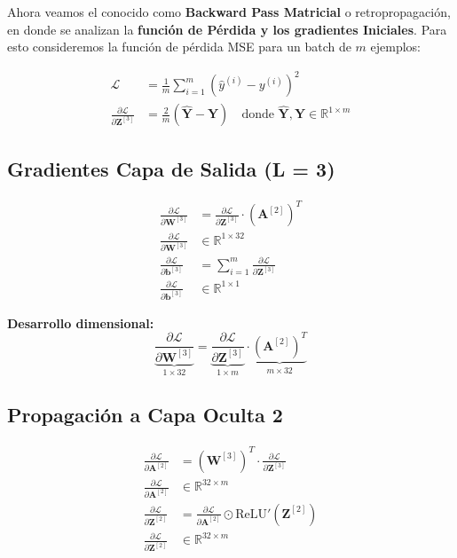 \documentclass[12pt]{article}
\begin{document}
Ahora veamos el conocido como \textbf{Backward Pass Matricial} o retropropagación, en donde se analizan la \textbf{función de Pérdida y los gradientes Iniciales}. Para esto consideremos la función de pérdida MSE para un batch de $m$ ejemplos:

\begin{align}
\mathcal{L} &= \frac{1}{m} \sum_{i=1}^m (\hat{y}^{(i)} - y^{(i)})^2 \\
\frac{\partial \mathcal{L}}{\partial \mathbf{Z}^{[3]}} &= \frac{2}{m} (\hat{\mathbf{Y}} - \mathbf{Y}) \quad \text{donde } \hat{\mathbf{Y}}, \mathbf{Y} \in \mathbb{R}^{1 \times m}
\end{align}

\subsection{Gradientes Capa de Salida (L = 3)}

\begin{align}
\frac{\partial \mathcal{L}}{\partial \mathbf{W}^{[3]}} &= \frac{\partial \mathcal{L}}{\partial \mathbf{Z}^{[3]}} \cdot (\mathbf{A}^{[2]})^T \\
\frac{\partial \mathcal{L}}{\partial \mathbf{W}^{[3]}} &\in \mathbb{R}^{1 \times 32} \\
\frac{\partial \mathcal{L}}{\partial \mathbf{b}^{[3]}} &= \sum_{i=1}^m \frac{\partial \mathcal{L}}{\partial \mathbf{Z}^{[3]}} \\
\frac{\partial \mathcal{L}}{\partial \mathbf{b}^{[3]}} &\in \mathbb{R}^{1 \times 1}
\end{align}

\textbf{Desarrollo dimensional:}
\begin{equation}
\underbrace{\frac{\partial \mathcal{L}}{\partial \mathbf{W}^{[3]}}}_{1 \times 32} = \underbrace{\frac{\partial \mathcal{L}}{\partial \mathbf{Z}^{[3]}}}_{1 \times m} \cdot \underbrace{(\mathbf{A}^{[2]})^T}_{m \times 32}
\end{equation}

\subsection{Propagación a Capa Oculta 2}

\begin{align}
\frac{\partial \mathcal{L}}{\partial \mathbf{A}^{[2]}} &= (\mathbf{W}^{[3]})^T \cdot \frac{\partial \mathcal{L}}{\partial \mathbf{Z}^{[3]}} \\
\frac{\partial \mathcal{L}}{\partial \mathbf{A}^{[2]}} &\in \mathbb{R}^{32 \times m} \\
\frac{\partial \mathcal{L}}{\partial \mathbf{Z}^{[2]}} &= \frac{\partial \mathcal{L}}{\partial \mathbf{A}^{[2]}} \odot \text{ReLU}'(\mathbf{Z}^{[2]}) \\
\frac{\partial \mathcal{L}}{\partial \mathbf{Z}^{[2]}} &\in \mathbb{R}^{32 \times m}
\end{align}
\end{document}
